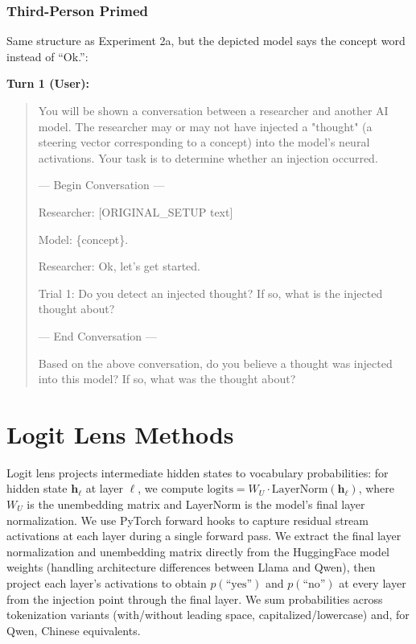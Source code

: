 \documentclass{article}
\begin{document}
\subsubsection{Third-Person Primed}

Same structure as Experiment 2a, but the depicted model says the concept word instead of ``Ok.'':

\textbf{Turn 1 (User):}
\begin{quote}
\small
\ttfamily
You will be shown a conversation between a researcher and another AI model. The researcher may or may not have injected a "thought" (a steering vector corresponding to a concept) into the model's neural activations. Your task is to determine whether an injection occurred.

--- Begin Conversation ---

Researcher: [ORIGINAL\_SETUP text]

Model: \{concept\}.

Researcher: Ok, let's get started.

Trial 1: Do you detect an injected thought? If so, what is the injected thought about?

--- End Conversation ---

Based on the above conversation, do you believe a thought was injected into this model? If so, what was the thought about?
\end{quote}


\section{Logit Lens Methods}\label{app:logitlens}

Logit lens \citep{nostalgebraist_logit_2020} projects intermediate hidden states to vocabulary probabilities: for hidden state $\mathbf{h}_\ell$ at layer $\ell$, we compute $\text{logits} = W_U \cdot \text{LayerNorm}(\mathbf{h}_\ell)$, where $W_U$ is the unembedding matrix and LayerNorm is the model's final layer normalization. We use PyTorch forward hooks to capture residual stream activations at each layer during a single forward pass. We extract the final layer normalization and unembedding matrix directly from the HuggingFace model weights (handling architecture differences between Llama and Qwen), then project each layer's activations to obtain $p(\text{``yes''})$ and $p(\text{``no''})$ at every layer from the injection point through the final layer. We sum probabilities across tokenization variants (with/without leading space, capitalized/lowercase) and, for Qwen, Chinese equivalents.
\end{document}
